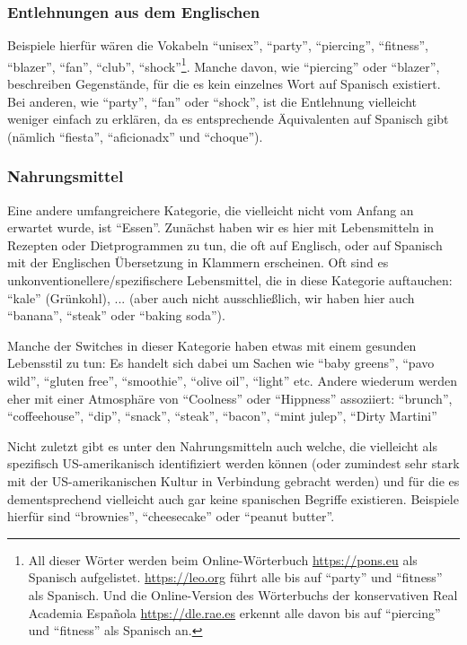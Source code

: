 \subsubsection{Entlehnungen aus dem Englischen}
Beispiele hierfür wären die Vokabeln ``unisex'', ``party'', ``piercing'', ``fitness'', ``blazer'', ``fan'', ``club'', ``shock''\footnote{All dieser Wörter werden beim Online-Wörterbuch \url{https://pons.eu} als Spanisch aufgelistet. \url{https://leo.org} führt alle bis auf ``party'' und ``fitness'' als Spanisch. Und die Online-Version des Wörterbuchs der konservativen Real Academia Española \url{https://dle.rae.es} erkennt alle davon bis auf ``piercing'' und ``fitness'' als Spanisch an.}.
Manche davon, wie ``piercing'' oder ``blazer'', beschreiben Gegenstände, für die es kein einzelnes Wort auf Spanisch existiert.
Bei anderen, wie ``party'', ``fan'' oder ``shock'',  ist die Entlehnung vielleicht weniger einfach zu erklären, da es entsprechende Äquivalenten auf Spanisch gibt (nämlich ``fiesta'', ``aficionadx'' und ``choque''). %

\subsubsection{Nahrungsmittel}
Eine andere umfangreichere Kategorie, die vielleicht nicht vom Anfang an erwartet wurde, ist ``Essen''.
Zunächst haben wir es hier mit Lebensmitteln in Rezepten oder Dietprogrammen zu tun, die oft auf Englisch, oder auf Spanisch mit der Englischen Übersetzung in Klammern erscheinen.
Oft sind es unkonventionellere/spezifischere Lebensmittel, die in diese Kategorie auftauchen: ``kale'' (Grünkohl), ... (aber auch nicht ausschließlich, wir haben hier auch ``banana'', ``steak'' oder ``baking soda''). %

Manche der Switches in dieser Kategorie haben etwas mit einem gesunden Lebensstil zu tun:
Es handelt sich dabei um Sachen wie ``baby greens'', ``pavo wild'', ``gluten free'', ``smoothie'', ``olive oil'', ``light'' etc.
Andere wiederum werden eher mit einer Atmosphäre von ``Coolness'' oder ``Hippness'' assoziiert:
``brunch'', ``coffeehouse'', ``dip'', ``snack'', ``steak'', ``bacon'', ``mint julep'', ``Dirty Martini''

Nicht zuletzt gibt es unter den Nahrungsmitteln auch welche, die vielleicht als spezifisch US-amerikanisch identifiziert werden können (oder zumindest sehr stark mit der US-amerikanischen Kultur in Verbindung gebracht werden) und für die es dementsprechend vielleicht auch gar keine spanischen Begriffe existieren.
Beispiele hierfür sind ``brownies'', ``cheesecake'' oder ``peanut butter''.


